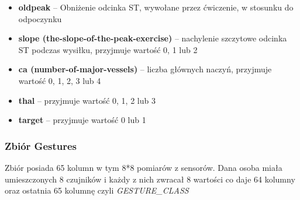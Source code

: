 \documentclass{classrep}
\begin{document}
{{{\begin{itemize}
                    \item \textbf{oldpeak} -- Obniżenie odcinka ST, wywołane przez ćwiczenie, w stosunku do odpoczynku   
                    \item \textbf{slope (the-slope-of-the-peak-exercise)} -- nachylenie szczytowe odcinka ST podczas wysiłku, przyjmuje wartość 0, 1 lub 2  
                    \item \textbf{ca (number-of-major-vessels)} -- liczba głównych naczyń, przyjmuje wartość 0, 1, 2, 3 lub 4  
                    \item \textbf{thal} -- przyjmuje wartość 0, 1, 2 lub 3   
                    \item \textbf{target} -- przyjmuje wartość 0 lub 1 
                \end{itemize}
                }
                
                \subsubsection{Zbiór Gestures}
                \label{opis_zbiorow_intro_gestures} {
                    Zbiór posiada 65 kolumn w tym 8*8 pomiarów z sensorów. Dana osoba miała 
                   umieszczonych 8 czujników i każdy z nich zwracał 8 wartości co daje 64 kolumny 
                   oraz ostatnia 65 kolumnę czyli \textit{GESTURE\_CLASS}
                }

}}
\end{document}
